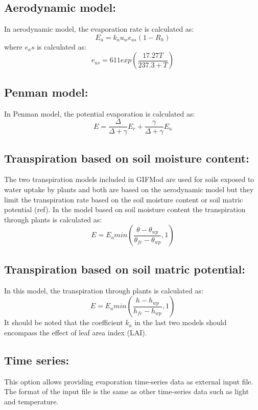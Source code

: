 \subsection{Aerodynamic model: }
In aerodynamic model, the evaporation rate is calculated as: 
\begin{equation}
\label{eq:16}
E_a = k_a u_w e_{as} (1 - R_h)
\end{equation}
where $e_as$ is calculated as: 
\begin{equation}
\label{eq:17}
e_{as} = 611 exp(\frac{17.27T}{237.3+T})
\end{equation}

\subsection{Penman model: }
In Penman model, the potential evaporation is calculated as:
\begin{equation}
\label{eq:18}
E=\frac{\Delta}{\Delta+\gamma}E_r + \frac{\gamma}{\Delta+\gamma}E_a
\end{equation}
\subsection{Transpiration based on soil moisture content: }
The two transpiration models included in GIFMod are used for soils exposed to water uptake by plants and both are based on the aerodynamic model but they limit the transpiration rate based on the soil moisture content or soil matric potential (ref). In the model based on soil moisture content the transpiration through plants is calculated as: 
\begin{equation}
\label{eq:19}
E=E_a min(\frac{\theta-\theta_{wp}}{\theta_{fc}-\theta_{wp}},1)
\end{equation}
\subsection{Transpiration based on soil matric potential: }
In this model, the transpiration through plants is calculated as: 
\begin{equation}
\label{eq:20}
E=E_a min(\frac{h-h_{wp}}{h_{fc}-h_{wp}},1)
\end{equation}
It should be noted that the coefficient $k_a$ in the last two models should encompass the effect of leaf area index (LAI). 
\subsection{Time series: }
This option allows providing evaporation time-series data as external input file. The format of the input file is the same as other time-series data such as light and temperature. 

